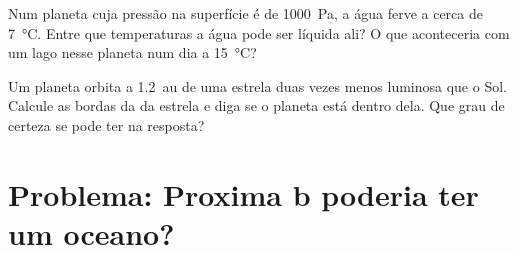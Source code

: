 \begin{exercise}[$\star\star\star$]\label{exo:g10:habitable-planet:14}
Num planeta cuja pressão na superfície é de \qty{1000}{Pa}, a água ferve a
cerca de \qty{7}{\degreeCelsius}. Entre que temperaturas a água pode ser
líquida ali? O que aconteceria com um lago nesse planeta num dia a
\qty{15}{\degreeCelsius}?
\end{exercise}

\begin{exercise}[$\star\star\star$]\label{exo:g10:habitable-planet:15}
Um planeta orbita a \qty{1.2}{au} de uma estrela duas vezes menos luminosa
que o Sol. Calcule as bordas da  da estrela e diga se o
planeta está dentro dela. Que grau de certeza se pode ter na resposta?
\end{exercise}

\section{Problema: Proxima b poderia ter um oceano?}

